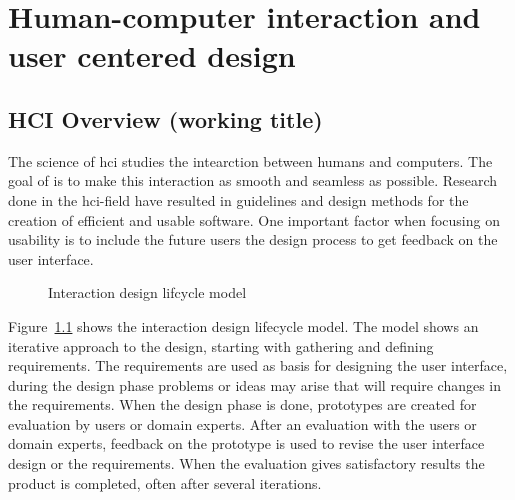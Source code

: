 \chapter{Human-computer interaction and user centered design}

\section{HCI Overview (working title)}
The science of \gls{hci} studies the intearction between humans and computers. The goal of is to make this interaction as smooth and seamless as possible. Research done in the \gls{hci}-field have resulted in guidelines and design methods for the creation of efficient and usable software. One important factor when focusing on usability is to include the future users the design process to get feedback on the user interface.

\begin{figure}
  \begin{center}
  \end{center}
  \caption{Interaction design lifcycle model}
  \label{fig:interactionDesignModel}
\end{figure}

Figure~\ref{fig:interactionDesignModel} shows the interaction design lifecycle model. The model shows an iterative approach to the design, starting with gathering and defining requirements. The requirements are used as basis for designing the user interface, during the design phase problems or ideas may arise that will require changes in the requirements. When the design phase is done, prototypes are created for evaluation by users or domain experts. After an evaluation with the users or domain experts, feedback on the prototype is used to revise the user interface design or the requirements. When the evaluation gives satisfactory results the product is completed, often after several iterations.


